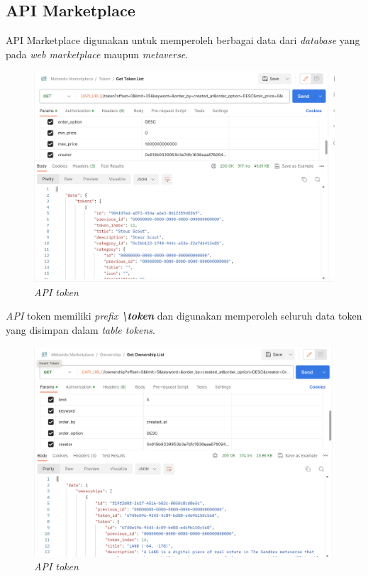 \subsection{API Marketplace} 

API Marketplace digunakan untuk memperoleh berbagai data dari \emph{database} yang pada \emph{web marketplace} maupun \emph{metaverse}.

\begin{figure} [H] \centering
  \includegraphics[scale=0.3]{gambar/img-api-tokens.png}
  \caption{\emph{API token} }
  \label{fig:APITokens}
\end{figure}

\emph{API} token memiliki \emph{prefix \textbf{\textbackslash token}} dan digunakan memperoleh seluruh data token yang disimpan dalam \emph{table tokens}. 

\begin{figure} [H] \centering
  \includegraphics[scale=0.3]{gambar/img-api-ownerships.png}
  \caption{\emph{API token} }
  \label{fig:APIOwnerships}
\end{figure}

